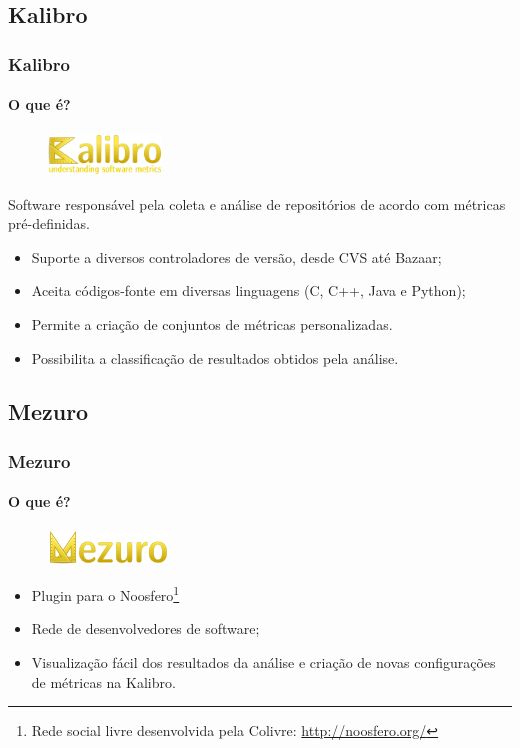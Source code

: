 \documentclass{beamer}
\begin{document}
  \subsection{Kalibro}
  
  \begin{frame}
    \frametitle{Kalibro}
    \framesubtitle{O que é?}
    
    \begin{figure}
      \begin{flushleft}
        \includegraphics[width=3cm, height=1.125cm]{images/logo-kalibro.png}
        \label{fig:logo-kalibro}
      \end{flushleft}
    \end{figure}
    
    Software responsável pela coleta e análise de repositórios de acordo com métricas pré-definidas.
    \begin{itemize}
      \item Suporte a diversos controladores de versão, desde CVS até Bazaar;
      \item Aceita códigos-fonte em diversas linguagens (C, C++, Java e Python);
      \item Permite a criação de conjuntos de métricas personalizadas.
      \item Possibilita a classificação de resultados obtidos pela análise.
    \end{itemize}
  \end{frame}
  
  \subsection{Mezuro}
  
  \begin{frame}
    \frametitle{Mezuro}
    \framesubtitle{O que é?}
    
    \begin{figure}
      \begin{flushleft}
        \includegraphics{images/logo-mezuro.png}
        \label{fig:logo-mezuro}
      \end{flushleft}
    \end{figure}
    
    \begin{itemize}
      \item Plugin para o Noosfero\footnote{Rede social livre desenvolvida pela Colivre: \url{http://noosfero.org/}}
      \item Rede de desenvolvedores de software;
      \item Visualização fácil dos resultados da análise e criação de novas configurações de métricas na Kalibro.
    \end{itemize}
  
  \end{frame}
  
\end{document}
